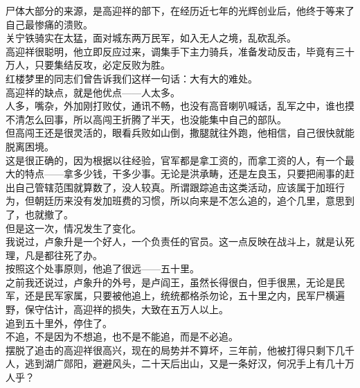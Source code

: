 \begin{multicols}{\theparacolNo}
尸体大部分的来源，是高迎祥的部下，在经历近七年的光辉创业后，他终于等来了自己最惨痛的溃败。\\

关宁铁骑实在太猛，面对城东两万民军，如入无人之境，乱砍乱杀。\\

高迎祥很聪明，他立即反应过来，调集手下主力骑兵，准备发动反击，毕竟有三十万人，只要集结反攻，必定反败为胜。\\

红楼梦里的同志们曾告诉我们这样一句话：大有大的难处。\\

高迎祥的缺点，就是他优点——人太多。\\

人多，嘴杂，外加刚打败仗，通讯不畅，也没有高音喇叭喊话，乱军之中，谁也摸不清怎么回事，所以高闯王折腾了半天，也没能集中自己的部队。\\

但高闯王还是很灵活的，眼看兵败如山倒，撒腿就往外跑，他相信，自己很快就能脱离困境。\\

这是很正确的，因为根据以往经验，官军都是拿工资的，而拿工资的人，有一个最大的特点——拿多少钱，干多少事。无论是洪承畴，还是左良玉，只要把闹事的赶出自己管辖范围就算数了，没人较真。所谓跟踪追击这类活动，应该属于加班行为，但朝廷历来没有发加班费的习惯，所以向来是不怎么追的，追个几里，意思到了，也就撤了。\\

但是这一次，情况发生了变化。\\

我说过，卢象升是一个好人，一个负责任的官员。这一点反映在战斗上，就是认死理，凡是都往死了办。\\

按照这个处事原则，他追了很远——五十里。\\

之前我还说过，卢象升的外号，是卢阎王，虽然长得很白，但手很黑，无论是民军，还是民军家属，只要被他追上，统统都格杀勿论，五十里之内，民军尸横遍野，保守估计，高迎祥的损失，大致在五万人以上。\\

追到五十里外，停住了。\\

不追，不是因为不想追，也不是不能追，而是不必追。\\

摆脱了追击的高迎祥很高兴，现在的局势并不算坏，三年前，他被打得只剩下几千人，逃到湖广郧阳，避避风头，二十天后出山，又是一条好汉，何况手上有几十万人乎？\\


\end{multicols}
